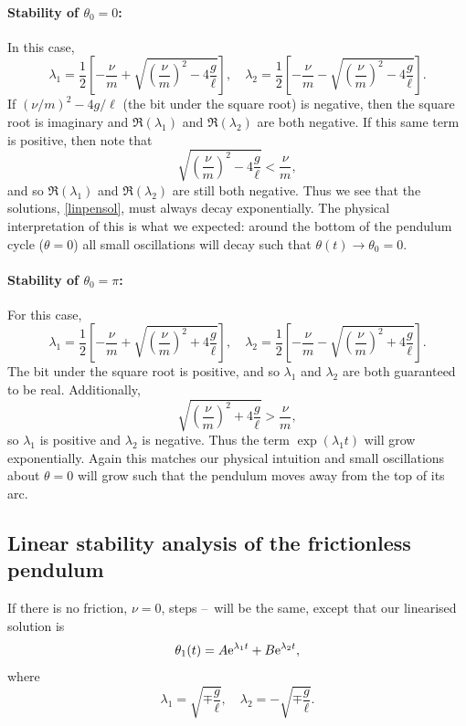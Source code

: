 \documentclass[main.tex]{subfiles}
\begin{document}
\paragraph{Stability of $\theta_0=0$:}
In this case,
\begin{equation}
    \lambda_1 = \frac{1}{2}\left[-\frac{\nu}{m} +
    \sqrt{\left(\frac{\nu}{m}\right)^2 - 4\frac{g}{\ell}} \right], \quad
    \lambda_2 = \frac{1}{2}\left[-\frac{\nu}{m} -
    \sqrt{\left(\frac{\nu}{m}\right)^2 - 4\frac{g}{\ell}} \right].
\end{equation}
If $(\nu/m)^2 - 4g/\ell$ (the bit under the square root) is negative, then the square root is imaginary and $\Re(\lambda_1)$ and $\Re(\lambda_2)$ are both negative. If this same term is positive, then note that
\begin{equation}
	\sqrt{\left(\frac{\nu}{m}\right)^2 - 4 \frac{g}{\ell}} < \frac{\nu}{m},
\end{equation}
and so $\Re(\lambda_1)$ and $\Re(\lambda_2)$ are still both negative. Thus we see that the solutions, \cref{linpensol}, must always decay exponentially. The physical interpretation of this is what we expected: around the bottom of the pendulum cycle ($\theta=0$) all small oscillations will decay such that $\theta(t) \to \theta_0=0$.

\paragraph{Stability of $\theta_0 =\pi$:}
For this case,
\begin{equation}
    \lambda_1 = \frac{1}{2}\left[-\frac{\nu}{m} +
    \sqrt{\left(\frac{\nu}{m}\right)^2 + 4\frac{g}{\ell}} \right], \quad
    \lambda_2 = \frac{1}{2}\left[-\frac{\nu}{m} -
    \sqrt{\left(\frac{\nu}{m}\right)^2 + 4\frac{g}{\ell}} \right].
\end{equation}
The bit under the square root is positive, and so $\lambda_1$ and $\lambda_2$ are both guaranteed to be real. Additionally,
\begin{equation}
 \sqrt{\left(\frac{\nu}{m}\right)^2 + 4 \frac{g}{\ell}}>\frac{\nu}{m},
\end{equation}
so $\lambda_1$ is positive and $\lambda_2$ is negative. Thus the term $\exp(\lambda_1 t)$ will grow exponentially. Again this matches our physical intuition and small oscillations about $\theta=0$ will grow such that the pendulum moves away from the top of its arc. 

\subsection{Linear stability analysis of the frictionless pendulum}
If there is no friction, $\nu =0$, steps \StepOneIcon--\StepThreeIcon\ will be the same, except that our linearised solution is 
\begin{equation}
\theta_1(t) = A\mathrm{e}^{\lambda_1 t} + B \mathrm{e}^{\lambda_2 t},
\end{equation}
where 
\begin{equation}
\lambda_{1} = \sqrt{\mp \frac{g}{\ell}}, \quad \lambda_{2} = - \sqrt{\mp \frac{g}{\ell}}.
\end{equation}
\end{document}
